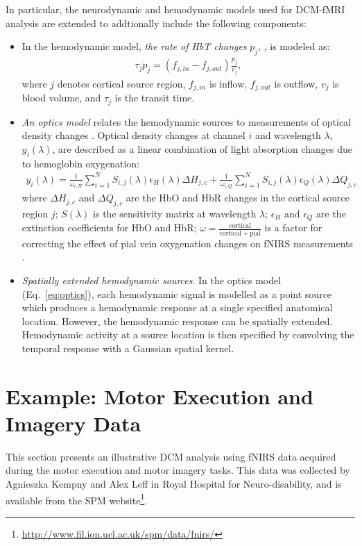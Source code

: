 In particular, the neurodynamic and hemodynamic models used for DCM-fMRI analysis \cite{Friston2003a} are extended to addtionally include the following components:
\begin{itemize} 
\item In the hemodynamic model, \emph{the rate of HbT changes} $\dot{p}_j$, \cite{cui10}, is modeled as:
\begin{eqnarray} 
\tau_j \dot{p}_j  =  \left(f_{j,in} - f_{j,out}\right)\frac{p_j}{v_j},
\end{eqnarray}
where $j$ denotes cortical source region, $f_{j,in}$ is inflow, $f_{j,out}$ is outflow, $v_j$ is blood volume, and $\tau_j$ is the transit time. 

\item \emph{An optics model} relates the hemodynamic sources to measurements of optical density changes \cite{delpy1988estimation, arridge1999optical}. Optical density changes at channel $i$ and wavelength $\lambda$, $y_i(\lambda)$, are described as a linear combination of light absorption changes due to hemoglobin oxygenation: 
\begin{eqnarray}\label{eq:optics} 
y_i (\lambda) = \frac{1}{\omega_{i,H}} \sum_{i=1}^{N} S_{i,j}(\lambda)\epsilon_H(\lambda) \Delta H_{j,c} +  \frac{1}{\omega_{i,Q}} \sum_{i=1}^{N} S_{i,j}(\lambda)\epsilon_Q(\lambda) \Delta Q_{j,c}
\end{eqnarray} 
where $\Delta H_{j,c}$ and $\Delta Q_{j,c}$ are the HbO and HbR changes in the cortical source region $j$; $S(\lambda)$ is the sensitivity matrix at wavelength $\lambda$; $\epsilon_H$ and $\epsilon_Q$ are the extinction coefficients for HbO and HbR; $\omega = \frac{\mathrm{cortical}}{\mathrm{cortical} + \mathrm{pial}}$ is a factor for correcting the effect of pial vein oxygenation changes on fNIRS measurements  \cite{gagnon2012quantification}. 

\item \emph{Spatially extended hemodynamic sources}. In the optics model (Eq.~\ref{eq:optics}), each hemodynamic signal is modelled as a point source which produces a hemodynamic response at a single specified anatomical location. However, the hemodynamic response can be spatially extended. Hemodynamic activity at a source location is then specified by convolving the temporal response with a Gaussian spatial kernel.

\end{itemize} 

\section{Example: Motor Execution and Imagery Data} 
This section presents an illustrative DCM analysis using fNIRS data acquired during the motor execution and motor imagery tasks. This data was collected by Agnieszka Kempny and Alex Leff in Royal Hospital for Neuro-disability, and is available from the SPM website\footnote{\url{http://www.fil.ion.ucl.ac.uk/spm/data/fnirs/}}.

